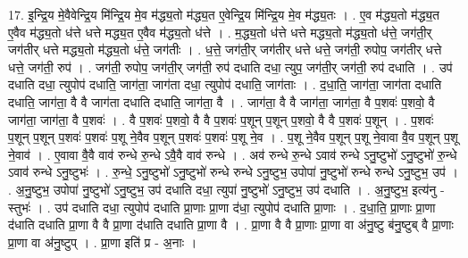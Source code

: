 \documentclass[17pt]{extarticle}
\begin{document}
17. इ॒न्द्रि॒य मे॒वैवेन्द्रि॒य मि॑न्द्रि॒य मे॒व म॑द्ध्य॒तो म॑द्ध्य॒त ए॒वेन्द्रि॒य मि॑न्द्रि॒य मे॒व म॑द्ध्य॒तः । . ए॒व म॑द्ध्य॒तो म॑द्ध्य॒त ए॒वैव म॑द्ध्य॒तो ध॑त्ते धत्ते मद्ध्य॒त ए॒वैव म॑द्ध्य॒तो ध॑त्ते । . म॒द्ध्य॒तो ध॑त्ते धत्ते मद्ध्य॒तो म॑द्ध्य॒तो ध॑त्ते॒ जग॑ती॒र् जग॑तीर् धत्ते मद्ध्य॒तो म॑द्ध्य॒तो ध॑त्ते॒ जग॑तीः । . ध॒त्ते॒ जग॑ती॒र् जग॑तीर् धत्ते धत्ते॒ जग॑ती॒ रुपोप॒ जग॑तीर् धत्ते धत्ते॒ जग॑ती॒ रुप॑ । . जग॑ती॒ रुपोप॒ जग॑ती॒र् जग॑ती॒ रुप॑ दधाति दधा॒ त्युप॒ जग॑ती॒र् जग॑ती॒ रुप॑ दधाति । . उप॑ दधाति दधा॒ त्युपोप॑ दधाति॒ जाग॑ता॒ जाग॑ता दधा॒ त्युपोप॑ दधाति॒ जाग॑ताः । . द॒धा॒ति॒ जाग॑ता॒ जाग॑ता दधाति दधाति॒ जाग॑ता॒ वै वै जाग॑ता दधाति दधाति॒ जाग॑ता॒ वै । . जाग॑ता॒ वै वै जाग॑ता॒ जाग॑ता॒ वै प॒शवः॑ प॒शवो॒ वै जाग॑ता॒ जाग॑ता॒ वै प॒शवः॑ । . वै प॒शवः॑ प॒शवो॒ वै वै प॒शवः॑ प॒शून् प॒शून् प॒शवो॒ वै वै प॒शवः॑ प॒शून् । . प॒शवः॑ प॒शून् प॒शून् प॒शवः॑ प॒शवः॑ प॒शू ने॒वैव प॒शून् प॒शवः॑ प॒शवः॑ प॒शू ने॒व । . प॒शू ने॒वैव प॒शून् प॒शू ने॒वावा वै॒व प॒शून् प॒शू ने॒वाव॑ । . ए॒वावा वै॒वै वाव॑ रुन्धे रु॒न्धे ऽवै॒वै वाव॑ रुन्धे । . अव॑ रुन्धे रु॒न्धे ऽवाव॑ रुन्धे ऽनु॒ष्टुभो॑ ऽनु॒ष्टुभो॑ रु॒न्धे ऽवाव॑ रुन्धे ऽनु॒ष्टुभः॑ । . रु॒न्धे॒ ऽनु॒ष्टुभो॑ ऽनु॒ष्टुभो॑ रुन्धे रुन्धे ऽनु॒ष्टुभ॒ उपोपा॑ नु॒ष्टुभो॑ रुन्धे रुन्धे ऽनु॒ष्टुभ॒ उप॑ । . अ॒नु॒ष्टुभ॒ उपोपा॑ नु॒ष्टुभो॑ ऽनु॒ष्टुभ॒ उप॑ दधाति दधा॒ त्युपा॑ नु॒ष्टुभो॑ ऽनु॒ष्टुभ॒ उप॑ दधाति । . अ॒नु॒ष्टुभ॒ इत्य॑नु - स्तुभः॑ । . उप॑ दधाति दधा॒ त्युपोप॑ दधाति प्रा॒णाः प्रा॒णा द॑धा॒ त्युपोप॑ दधाति प्रा॒णाः । . द॒धा॒ति॒ प्रा॒णाः प्रा॒णा द॑धाति दधाति प्रा॒णा वै वै प्रा॒णा द॑धाति दधाति प्रा॒णा वै । . प्रा॒णा वै वै प्रा॒णाः प्रा॒णा वा अ॑नु॒ष्टु ब॑नु॒ष्टुब् वै प्रा॒णाः प्रा॒णा वा अ॑नु॒ष्टुप् । . प्रा॒णा इति॑ प्र - अ॒नाः । \newline
\end{document}
